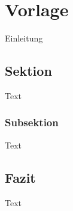\chapter{Vorlage}

Einleitung



\section{Sektion}

Text



\subsection{Subsektion}

Text



\section{Fazit}

Text
